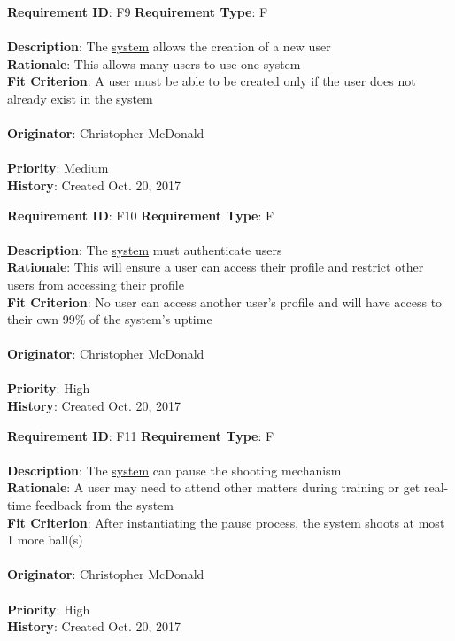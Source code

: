 \documentclass[11pt]{article}
\begin{document}
\begin{framed}
	\noindent\textbf{Requirement ID}: F9 \hfill \textbf{Requirement Type}: F \hfill\\\\
	\noindent\textbf{Description}: The \hyperref[sec:definitions]{system} allows the creation of a new user \\
	\textbf{Rationale}: This allows many users to use one system \\
	\textbf{Fit Criterion}: A user must be able to be created only if the user does not already exist in the system \\\\
	\textbf{Originator}: Christopher McDonald \\\\
	\textbf{Priority}: Medium \hfill \\
	\noindent\textbf{History}: Created Oct. 20, 2017
\end{framed}

\begin{framed}
	\noindent\textbf{Requirement ID}: F10 \hfill \textbf{Requirement Type}: F \hfill\\\\
	\noindent\textbf{Description}: The \hyperref[sec:definitions]{system} must authenticate users \\
	\textbf{Rationale}: This will ensure a user can access their profile and restrict other users from accessing their profile \\
	\textbf{Fit Criterion}: No user can access another user's profile and will have access to their own 99\% of the system's uptime \\\\
	\textbf{Originator}: Christopher McDonald \\\\
	\textbf{Priority}: High \hfill \\
	\noindent\textbf{History}: Created Oct. 20, 2017
\end{framed}

\begin{framed}
	\noindent\textbf{Requirement ID}: F11 \hfill \textbf{Requirement Type}: F \hfill\\\\
	\noindent\textbf{Description}: The \hyperref[sec:definitions]{system} can pause the shooting mechanism \\
	\textbf{Rationale}: A user may need to attend other matters during training or get real-time feedback from the system \\
	\textbf{Fit Criterion}: After instantiating the pause process, the system shoots at most 1 more ball(s) \\\\
	\textbf{Originator}: Christopher McDonald \\\\
	\textbf{Priority}: High \hfill \\
	\noindent\textbf{History}: Created Oct. 20, 2017
\end{framed}
\end{document}
